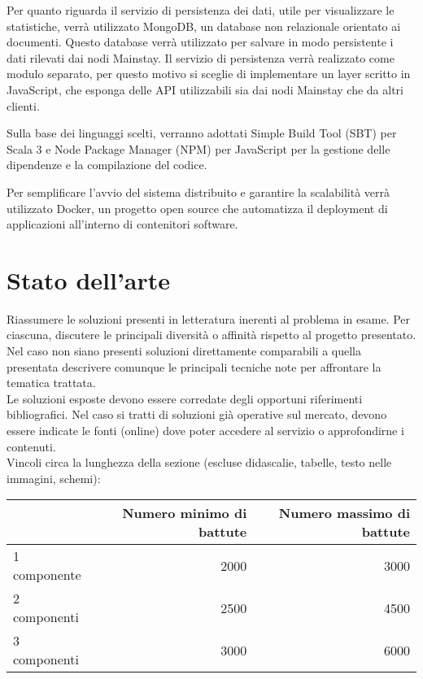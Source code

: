 \documentclass[12pt]{article}
\begin{document}
Per quanto riguarda il servizio di persistenza dei dati, utile per visualizzare le statistiche, verrà utilizzato MongoDB, un database non relazionale orientato ai documenti. Questo database verrà utilizzato per salvare in modo persistente i dati rilevati dai nodi Mainstay.
Il servizio di persistenza verrà realizzato come modulo separato, per questo motivo si sceglie di implementare un layer scritto in JavaScript, che esponga delle API utilizzabili sia dai nodi Mainstay che da altri clienti.

Sulla base dei linguaggi scelti, verranno adottati Simple Build Tool (SBT) per Scala 3 e Node Package Manager (NPM) per JavaScript per la gestione delle dipendenze e la compilazione del codice.

Per semplificare l'avvio del sistema distribuito e garantire la scalabilità verrà utilizzato Docker, un progetto open source che automatizza il deployment di applicazioni all'interno di contenitori software.

\newpage


\section{Stato dell'arte}

Riassumere le soluzioni presenti in letteratura inerenti al problema in esame. Per ciascuna, discutere le principali diversità o affinità rispetto al progetto presentato. Nel caso non siano presenti soluzioni direttamente comparabili a quella presentata descrivere comunque le principali tecniche note per affrontare la tematica trattata.\\

Le soluzioni esposte devono essere corredate degli opportuni riferimenti bibliografici. Nel caso si tratti di soluzioni già operative sul mercato, devono essere indicate le fonti (online) dove poter accedere al servizio o approfondirne i contenuti.\\


Vincoli circa la lunghezza della sezione (escluse didascalie, tabelle, testo nelle immagini, schemi):

\vspace{1cm}
\begin{tabular}{l|rr}
 & Numero minimo di battute & Numero massimo di battute \\
 \hline
 1 componente & 2000 & 3000 \\
 2 componenti & 2500 & 4500 \\
 3 componenti & 3000 & 6000 \\
 \hline
\end{tabular}
\end{document}

